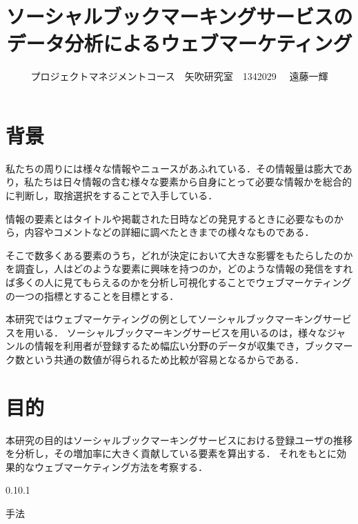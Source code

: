 \documentclass[uplatex,twocolumn,dvipdfmx]{jsarticle}
\title{\vspace{-5mm}\fontsize{14pt}{0pt}\selectfont ソーシャルブックマーキングサービスのデータ分析によるウェブマーケティング}
\author{\normalsize プロジェクトマネジメントコース　矢吹研究室　1342029 　遠藤一輝}
\date{}
\begin{document}
\fontsize{10.5pt}{\baselineskip}\selectfont
\maketitle





\section{背景}

私たちの周りには様々な情報やニュースがあふれている．その情報量は膨大であり，私たちは日々情報の含む様々な要素から自身にとって必要な情報かを総合的に判断し，取捨選択をすることで入手している\cite{yahoo}．\par
情報の要素とはタイトルや掲載された日時などの発見するときに必要なものから，内容やコメントなどの詳細に調べたときまでの様々なものである．\par
そこで数多くある要素のうち，どれが決定において大きな影響をもたらしたのかを調査し，人はどのような要素に興味を持つのか，どのような情報の発信をすれば多くの人に見てもらえるのかを分析し可視化することでウェブマーケティングの一つの指標とすることを目標とする．\par
本研究ではウェブマーケティングの例としてソーシャルブックマーキングサービスを用いる．
ソーシャルブックマーキングサービスを用いるのは，様々なジャンルの情報を利用者が登録するため幅広い分野のデータが収集でき，ブックマーク数という共通の数値が得られるため比較が容易となるからである．

\section{目的}

本研究の目的はソーシャルブックマーキングサービスにおける登録ユーザの推移を分析し，その増加率に大きく貢献している要素を算出する．
それをもとに効果的なウェブマーケティング方法を考察する．　　　　　　　　　　　　　　　　　　　　　　　　　　　　　　　　　　　　　　　　　　　

\makeatletter
  \renewcommand{\section}{%
    \@startsection{section}{1}{\z@}%
    {0.1\Cvs}{0.1\Cvs}%
    {\normalfont\large\headfont\raggedright}}
\makeatother

\section{手法}
\end{document}
